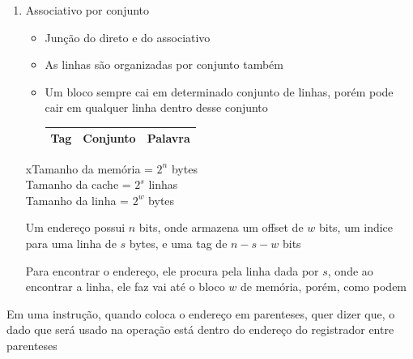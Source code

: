 \documentclass[12pt]{article}
\begin{document}
\begin{itemize}
\begin{itemize}
\begin{enumerate}
\begin{itemize}
\begin{table}[H]
\begin{tabular}{|l|r|}
                        \hline
                        Tag & Palavra \\ \hline
                    \end{tabular}
                \end{table}
                \item No associativo, a \textbf{tag} é maior que por mapeamento 
                direto
            \end{itemize}
            \item Associativo por conjunto
            \begin{itemize}
                \item Junção do direto e do associativo
                \item As linhas são organizadas por conjunto também
                \item Um bloco sempre cai em determinado conjunto de linhas, 
                porém pode cair em qualquer linha dentro desse conjunto
                \begin{table}[H]
                    \centering
                    \begin{tabular}{|l|c|r|}
                        \hline
                        Tag & Conjunto & Palavra \\ \hline
                    \end{tabular}
                \end{table}
            \end{itemize}
            xTamanho da memória = $2^n$ bytes\\
            Tamanho da cache = $2^s$ linhas\\
            Tamanho da linha = $2^w$ bytes
            \vspace{12pt}

            Um endereço possui $n$ bits, onde armazena um offset de $w$ bits, 
            um indice para uma linha de $s$ bytes, e uma tag de $n-s-w$ bits

            Para encontrar o endereço, ele procura pela linha dada por $s$, 
            onde ao encontrar a linha, ele faz vai até o bloco $w$ de memória, 
            porém, como podem 
    
        \end{enumerate}

    \end{itemize}
\end{itemize}

Em uma instrução, quando coloca o endereço em parenteses, quer dizer que, o 
dado que será usado na operação está dentro do endereço do registrador entre 
parenteses
\end{document}

